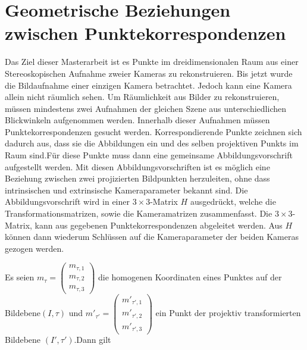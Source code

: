 \chapter{Geometrische Beziehungen zwischen Punktekorrespondenzen}
\label{sec:HFE}

Das Ziel dieser Masterarbeit ist es Punkte im dreidimensionalen Raum aus einer Stereoskopischen Aufnahme zweier Kameras zu rekonstruieren. Bis jetzt wurde die Bildaufnahme einer einzigen Kamera betrachtet. Jedoch kann eine Kamera allein nicht räumlich sehen. Um Räumlichkeit aus Bilder zu rekonstruieren, müssen mindestens zwei Aufnahmen der gleichen Szene aus unterschiedlichen Blickwinkeln aufgenommen werden. Innerhalb dieser Aufnahmen müssen Punktekorrespondenzen gesucht werden. Korrespondierende Punkte zeichnen sich dadurch aus, dass sie die Abbildungen ein und des selben projektiven Punkts im Raum sind.Für diese Punkte muss dann eine gemeinsame Abbildungsvorschrift aufgestellt werden. Mit diesen Abbildungsvorschriften ist es möglich eine Beziehung zwischen zwei projizierten Bildpunkten 
herzuleiten, ohne dass intrinsischen und extrinsische Kameraparameter bekannt sind. Die Abbildungsvorschrift wird in einer $3 \times 3$-Matrix $H$ ausgedrückt, welche die Transformationsmatrizen, sowie die Kameramatrizen zusammenfasst. Die $3 \times 3$-Matrix, kann aus gegebenen Punktekorrespondenzen abgeleitet werden. Aus $H$ können dann wiederum Schlüssen auf die Kameraparameter der beiden Kameras gezogen werden.  


%

Es seien \ensuremath{m_{\tau} = \begin{pmatrix}
		m_{\tau,1}\\m_{\tau,2}\\m_{\tau,3}
\end{pmatrix}} die homogenen Koordinaten eines Punktes auf der Bildebene$(I,\tau)$ und \ensuremath{m'_{\tau'} = \begin{pmatrix}
		m'_{\tau',1}\\m'_{\tau',2}\\m'_{\tau',3}
\end{pmatrix}} ein Punkt der projektiv transformierten Bildebene $(I',\tau')$.Dann gilt

